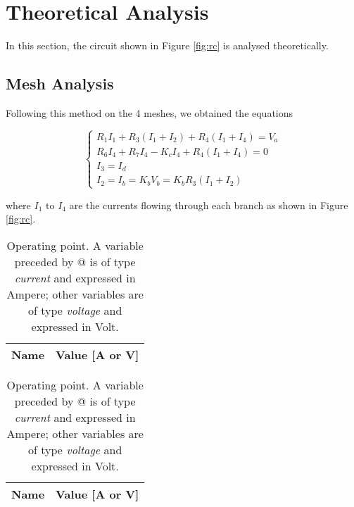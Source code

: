 \section{Theoretical Analysis}
\label{sec:analysis}

In this section, the circuit shown in Figure \ref{fig:rc} is analysed
theoretically.

\subsection{Mesh Analysis}
Following this method on the 4 meshes, we obtained the equations

\begin{equation}
\begin{cases}
R_1 I_1 + R_3 (I_1+I_2)+R_4(I_1+I_4)=V_a\\
R_6 I_4 + R_7 I_4 -K_c I_4 + R_4 (I_1+I_4)=0\\
I_3=I_d\\
I_2=I_b=K_b V_b = K_b R_3 (I_1+I_2)
\end{cases}
\end{equation}

where $I_1$ to $I_4$ are the currents flowing through each branch as shown in Figure \ref{fig:rc}.

\begin{table}[h]
  \centering
  \begin{tabular}{|l|r|}
    \hline    
    {\bf Name} & {\bf Value [A or V]} \\ \hline
    
 \end{tabular}
 \caption{Operating point. A variable preceded by @ is of type {\em current}
   and expressed in Ampere; other variables are of type {\it voltage} and expressed in
   Volt.}
  \label{tab:op}
\end{table}

\begin{table}[h]
  \centering
  \begin{tabular}{|l|r|}
    \hline    
    {\bf Name} & {\bf Value [A or V]} \\ \hline
    
 \end{tabular}
 \caption{Operating point. A variable preceded by @ is of type {\em current}
   and expressed in Ampere; other variables are of type {\it voltage} and expressed in
   Volt.}
  \label{tab:op}
\end{table}

